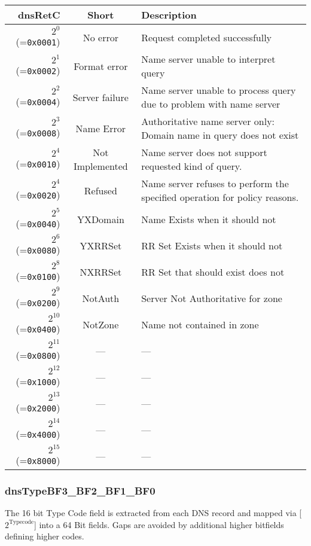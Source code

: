 \documentclass[documentation]{subfiles}
\begin{document}
\begin{longtable}{rcl}
    \toprule
    {\bf dnsRetC} & {\bf Short} & {\bf Description}\\
    \midrule\endhead%
    $2^{0}$  (={\tt 0x0001}) & No error & Request completed successfully \\
    $2^{1}$  (={\tt 0x0002}) & Format error & Name server unable to interpret query \\
    $2^{2}$  (={\tt 0x0004}) & Server failure & Name server unable to process query due to problem with name server \\
    $2^{3}$  (={\tt 0x0008}) & Name Error & Authoritative name server only: Domain name in query does not exist \\
    $2^{4}$  (={\tt 0x0010}) & Not Implemented & Name server does not support requested kind of query.\\
    $2^{4}$  (={\tt 0x0020}) & Refused & Name server refuses to perform the specified operation for policy reasons. \\
    $2^{5}$  (={\tt 0x0040}) & YXDomain & Name Exists when it should not \\
    $2^{6}$  (={\tt 0x0080}) & YXRRSet & RR Set Exists when it should not \\
    $2^{8}$  (={\tt 0x0100}) & NXRRSet & RR Set that should exist does not \\
    $2^{9}$  (={\tt 0x0200}) & NotAuth & Server Not Authoritative for zone \\
    $2^{10}$ (={\tt 0x0400}) & NotZone & Name not contained in zone \\
    $2^{11}$ (={\tt 0x0800}) & --- & --- \\
    $2^{12}$ (={\tt 0x1000}) & --- & --- \\
    $2^{13}$ (={\tt 0x2000}) & --- & --- \\
    $2^{14}$ (={\tt 0x4000}) & --- & --- \\
    $2^{15}$ (={\tt 0x8000}) & --- & --- \\
    \bottomrule
\end{longtable}

\subsubsection{dnsTypeBF3\_BF2\_BF1\_BF0}\label{dnsTypeBF}
The 16 bit Type Code field is extracted from each DNS record and mapped via [$2^{\text{Typecode}}$] into a
64 Bit fields. Gaps are avoided by additional higher bitfields defining higher codes.
\end{document}
